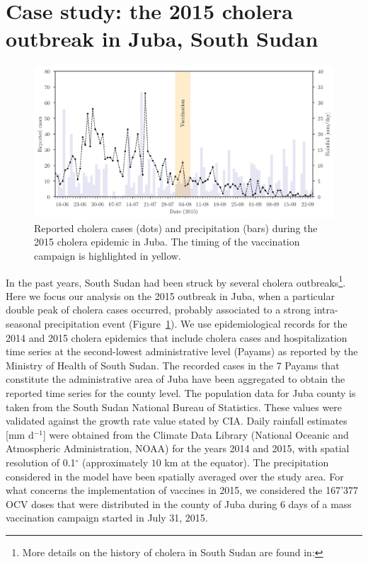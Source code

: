 \section{Case study: the 2015 cholera outbreak in Juba, South Sudan}\label{sec:data sets}
\begin{figure}\centering
  \includegraphics[width=\textwidth]{fig_cholera-rainfall/Lemaitre_ACTROP_2018_42_R1_fig2.png}
  \caption[Cholera cases and precipitation during the 2015 epidemic in Juba]{Reported cholera cases (dots) and precipitation (bars) during the 2015 cholera epidemic in Juba. The timing of the vaccination campaign is highlighted in yellow.}
  \label{fig:report}
\end{figure}
In the past years, South Sudan had been struck by several cholera outbreaks\footnote{More details on the history of cholera in South Sudan are found in: }. Here we focus our analysis on the 2015 outbreak in Juba, when a particular double peak of cholera cases occurred, probably associated to a strong intra-seasonal precipitation event (Figure~\ref{fig:report}). We use epidemiological records for the 2014 and 2015 cholera epidemics that include cholera cases and hospitalization time series at the second-lowest administrative level  (Payams) as reported by the Ministry of Health of South Sudan. The recorded cases in the 7 Payams that constitute the administrative area of Juba have been aggregated to obtain the reported time series for the county level. The population data for Juba county is taken from the South Sudan National Bureau of Statistics\cite{SSNBS:PopulationProjectionsSouth:2015}.
These values were validated against the growth rate value stated by CIA\cite{CIA:SouthSudan:2015}. Daily rainfall estimates [mm d$^{-1}$] were obtained from the Climate Data Library (National Oceanic and Atmospheric Administration, NOAA)\cite{IRI/LDEO:ClimateDataLibrary:2016} for the years 2014 and 2015, with spatial resolution of {0.1}$^\circ$ (approximately $10$ km at the equator). The precipitation considered in the model have been spatially averaged over the study area. For what concerns the implementation of vaccines in 2015, we considered the 167'377 OCV doses that were distributed in the county of Juba during 6 days of a mass vaccination campaign started in July 31, 2015\cite{Abubakar:FirstUseGlobal:2015,Azman:EffectivenessOneDose:2016,Parker:AdaptingGlobalShortage:2017}.


